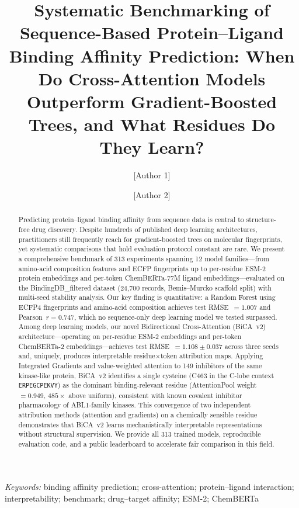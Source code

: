 \documentclass[11pt,twocolumn]{article}
\title{\textbf{Systematic Benchmarking of Sequence-Based Protein--Ligand Binding
       Affinity Prediction: When Do Cross-Attention Models Outperform
       Gradient-Boosted Trees, and What Residues Do They Learn?}}
\author[1]{[Author 1]}
\author[2]{[Author 2]}
\affil[1]{[Institution 1]}
\affil[2]{[Institution 2]}
\date{}
\newcommand{\keywords}[1]{\noindent\textit{Keywords:} #1\vspace{1em}}
\begin{document}
\maketitle

\keywords{binding affinity prediction; cross-attention; protein--ligand
  interaction; interpretability; benchmark; drug--target affinity;
  ESM-2; ChemBERTa}

\begin{abstract}
Predicting protein--ligand binding affinity from sequence data is central to
structure-free drug discovery.  Despite hundreds of published deep learning
architectures, practitioners still frequently reach for gradient-boosted
trees on molecular fingerprints, yet systematic comparisons that hold
evaluation protocol constant are rare.  We present a comprehensive benchmark
of 313 experiments spanning 12 model families---from amino-acid composition
features and ECFP fingerprints up to per-residue ESM-2 protein embeddings
and per-token ChemBERTa-77M ligand embeddings---evaluated on the
BindingDB\_filtered dataset (24,700 records, Bemis--Murcko scaffold split)
with multi-seed stability analysis.  Our key finding is quantitative: a
Random Forest using ECFP4 fingerprints and amino-acid composition achieves
test RMSE~$=1.007$ and Pearson~$r=0.747$, which no sequence-only deep
learning model we tested surpassed.  Among deep learning models, our novel
Bidirectional Cross-Attention (BiCA~v2) architecture---operating on
per-residue ESM-2 embeddings and per-token ChemBERTa-2 embeddings---achieves
test RMSE~$=1.108 \pm 0.037$ across three seeds and, uniquely, produces
interpretable residue$\times$token attribution maps.  Applying Integrated
Gradients and value-weighted attention to 149 inhibitors of the same
kinase-like protein, BiCA~v2 identifies a single cysteine (C463 in the
C-lobe context \texttt{ERPEGCPEKVY}) as the dominant binding-relevant residue
(AttentionPool weight~$= 0.949$, $485\times$ above uniform), consistent with
known covalent inhibitor pharmacology of ABL1-family kinases.  This
convergence of two independent attribution methods (attention and gradients)
on a chemically sensible residue demonstrates that BiCA~v2 learns
mechanistically interpretable representations without structural supervision.
We provide all 313 trained models, reproducible evaluation code, and a
public leaderboard to accelerate fair comparison in this field.
\end{abstract}
\end{document}
